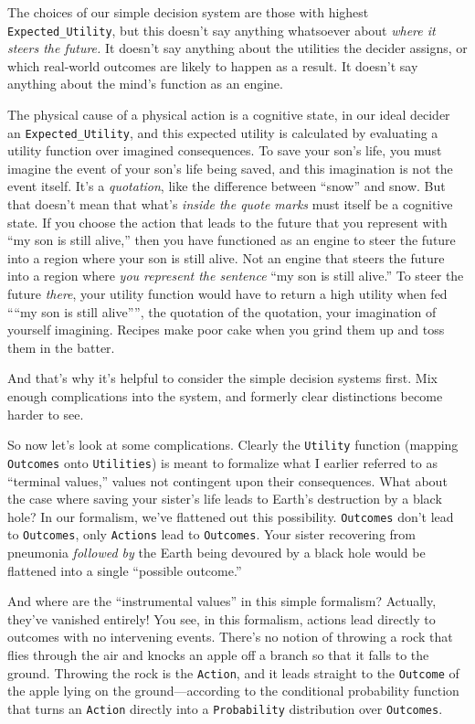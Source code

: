 {
 The choices of our simple decision system are those with highest
\texttt{Expected\_Utility}, but this doesn't say anything
whatsoever about \textit{where it steers the future.} It
doesn't say anything about the utilities the decider
assigns, or which real-world outcomes are likely to happen as a result.
It doesn't say anything about the
mind's function as an engine.}

{
 The physical cause of a physical action is a cognitive state, in
our ideal decider an \texttt{Expected\_Utility}, and this expected utility is
calculated by evaluating a utility function over imagined consequences.
To save your son's life, you must imagine the event of
your son's life being saved, and this imagination is
not the event itself. It's a \textit{quotation}, like
the difference between ``snow'' and
snow. But that doesn't mean that what's
\textit{inside the quote marks} must itself be a cognitive state. If
you choose the action that leads to the future that you represent with
``my son is still alive,'' then you
have functioned as an engine to steer the future into a region where
your son is still alive. Not an engine that steers the future into a
region where \textit{you represent the sentence} ``my
son is still alive.'' To steer the future
\textit{there}, your utility function would have to return a high
utility when fed ````my son is still
alive'''', the quotation of the
quotation, your imagination of yourself imagining. Recipes make poor
cake when you grind them up and toss them in the batter.}

{
 And that's why it's helpful to
consider the simple decision systems first. Mix enough complications
into the system, and formerly clear distinctions become harder to see.}

{
 So now let's look at some complications. Clearly
the \texttt{Utility} function (mapping \texttt{Outcomes} onto \texttt{Utilities}) is meant to
formalize what I earlier referred to as ``terminal
values,'' values not contingent upon their
consequences. What about the case where saving your
sister's life leads to Earth's
destruction by a black hole? In our formalism, we've
flattened out this possibility. \texttt{Outcomes} don't lead to
\texttt{Outcomes}, only \texttt{Actions} lead to \texttt{Outcomes}. Your sister recovering from
pneumonia \textit{followed by} the Earth being devoured by a black hole
would be flattened into a single ``possible
outcome.''}

{
 And where are the ``instrumental
values'' in this simple formalism? Actually,
they've vanished entirely! You see, in this formalism,
actions lead directly to outcomes with no intervening events.
There's no notion of throwing a rock that flies through
the air and knocks an apple off a branch so that it falls to the
ground. Throwing the rock is the \texttt{Action}, and it leads straight to the
\texttt{Outcome} of the apple lying on the ground---according to the conditional
probability function that turns an \texttt{Action} directly into a \texttt{Probability}
distribution over \texttt{Outcomes}.}

